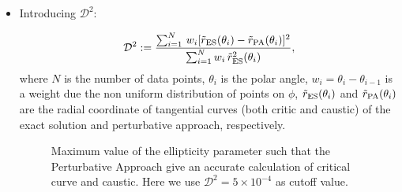 \documentclass[useAMS,usenatbib]{mn2e}
\begin{document}
\begin{itemize}
\item Introducing $\mathcal{D}^2$:

\begin{equation}
\mathcal{D}^ 2  :=\frac{\sum_{i=1}^N\,w_i[\tilde{r}_{\rm ES}(\theta_{i})-\tilde{r}_{\rm PA}(\theta_{i}) ]^2 }%
  {\sum_{i=1}^N w_i\, \tilde{r}_{\rm ES}^2(\theta_{i})},
  \label{D2_pm}
 \end{equation}
where $N$ is the number of data points, $\theta_i$ is the polar angle,
$w_i=\theta_i-\theta_{i-1}$ is a weight due the non uniform  distribution of points on $\phi$, $\tilde{r}_{\rm ES}(\theta_{i})$ and $\tilde{r}_{\rm PA}(\theta_{i})$ are the radial coordinate of tangential curves (both critic and caustic) of the exact solution and perturbative approach, respectively.


\begin{figure}
\begin{center}
\caption{\label{d2_cut_value} Maximum value of the ellipticity parameter such that the Perturbative Approach give an accurate calculation of critical curve and caustic. Here we use $\mathcal{D}^2=5\times 10^{-4}$ as cutoff value.}
\end{center}
\end{figure}




\end{itemize}
\end{document}
